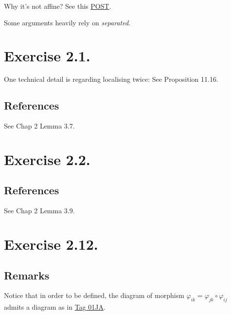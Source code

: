 Why it's not affine? See this \href{https://mathoverflow.net/questions/87480/explanation-on-a-scheme-which-is-not-affine-scheme}{POST}. 

Some arguments heavily rely on \textit{separated}.

\section{Exercise 2.1.}\label{Hart Ex 2.1.}

One technical detail is regarding localising twice: See \cite{altman2013term} Proposition 11.16.

\subsection{References}

See \cite{qing2006algebraic} Chap 2 Lemma 3.7. 

\section{Exercise 2.2.}

\subsection{References}

See \cite{qing2006algebraic} Chap 2 Lemma 3.9.

\section{Exercise 2.12.}

\subsection{Remarks}

Notice that in order to be defined, the diagram of morphism $\varphi_{ik}=\varphi_{jk}\circ\varphi_{ij}$ admits a diagram as in \href{https://stacks.math.columbia.edu/tag/01JA}{Tag 01JA}.